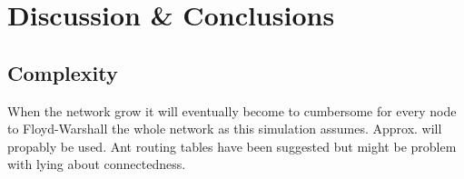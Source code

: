 \chapter{Discussion \& Conclusions}

\section{Complexity}

When the network grow it will eventually become to cumbersome for every node to Floyd-Warshall the whole network as this simulation assumes. Approx. will propably be used. Ant routing tables have been suggested but might be problem with lying about connectedness.
